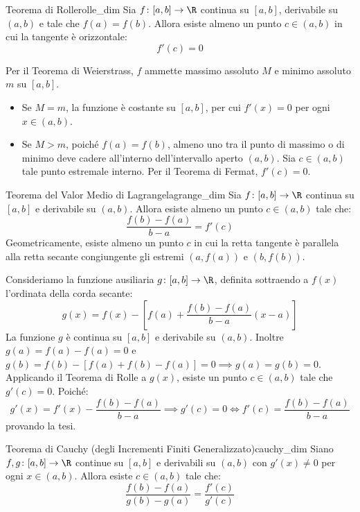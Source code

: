 \begin{teorema}{Teorema di Rolle}{rolle_dim}
Sia $f \colon [a, b] \to \R$ continua su $[a, b]$, derivabile su $(a, b)$ e tale che $f(a) = f(b)$.
Allora esiste almeno un punto $c \in (a, b)$ in cui la tangente è orizzontale:
\[
    f'(c) = 0
\]
\end{teorema}

\begin{dimostrazione}
Per il Teorema di Weierstrass, $f$ ammette massimo assoluto $M$ e minimo assoluto $m$ su $[a, b]$.
\begin{itemize}
    \item Se $M = m$, la funzione è costante su $[a, b]$, per cui $f'(x) = 0$ per ogni $x \in (a, b)$.
    \item Se $M > m$, poiché $f(a) = f(b)$, almeno uno tra il punto di massimo o di minimo deve cadere all'interno dell'intervallo aperto $(a, b)$. Sia $c \in (a, b)$ tale punto estremale interno. Per il Teorema di Fermat, $f'(c) = 0$.
\end{itemize}
\end{dimostrazione}

\begin{teorema}{Teorema del Valor Medio di Lagrange}{lagrange_dim}
Sia $f \colon [a, b] \to \R$ continua su $[a, b]$ e derivabile su $(a, b)$.
Allora esiste almeno un punto $c \in (a, b)$ tale che:
\[
    \frac{f(b) - f(a)}{b - a} = f'(c)
\]
Geometricamente, esiste almeno un punto $c$ in cui la retta tangente è parallela alla retta secante congiungente gli estremi $(a, f(a))$ e $(b, f(b))$.
\end{teorema}

\begin{dimostrazione}
Consideriamo la funzione ausiliaria $g \colon [a, b] \to \R$, definita sottraendo a $f(x)$ l'ordinata della corda secante:
\[
    g(x) = f(x) - \left[ f(a) + \frac{f(b) - f(a)}{b - a}(x - a) \right]
\]
La funzione $g$ è continua su $[a, b]$ e derivabile su $(a, b)$. Inoltre $g(a) = f(a) - f(a) = 0$ e $g(b) = f(b) - [f(a) + f(b) - f(a)] = 0 \implies g(a) = g(b) = 0$.
Applicando il Teorema di Rolle a $g(x)$, esiste un punto $c \in (a, b)$ tale che $g'(c) = 0$. Poiché:
\[
    g'(x) = f'(x) - \frac{f(b) - f(a)}{b - a} \implies g'(c) = 0 \iff f'(c) = \frac{f(b) - f(a)}{b - a}
\]
provando la tesi.
\end{dimostrazione}

\begin{teorema}{Teorema di Cauchy (degli Incrementi Finiti Generalizzato)}{cauchy_dim}
Siano $f, g \colon [a, b] \to \R$ continue su $[a, b]$ e derivabili su $(a, b)$ con $g'(x) \neq 0$ per ogni $x \in (a, b)$.
Allora esiste $c \in (a, b)$ tale che:
\[
    \frac{f(b) - f(a)}{g(b) - g(a)} = \frac{f'(c)}{g'(c)}
\]
\end{teorema}

